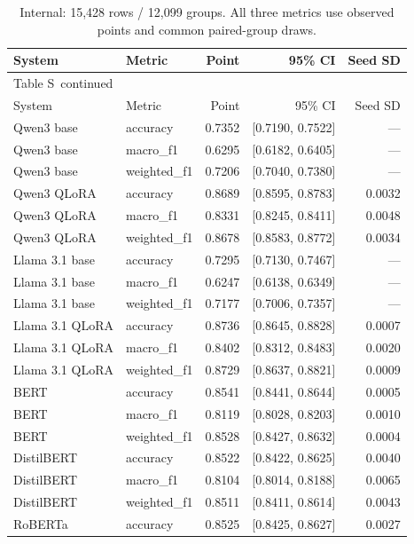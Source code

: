 \documentclass[10pt,a4paper]{article}
\renewcommand{\thetable}{S\arabic{table}}
\begin{document}
{\small
\setlength{\tabcolsep}{4pt}
\begin{longtable}{@{}llrrr@{}}
\caption{Internal: 15,428 rows / 12,099 groups. All three metrics use observed points and common paired-group draws.}\label{sup:metrics-internal}\\
\toprule
System & Metric & Point & 95\% CI & Seed SD \\
\midrule\endfirsthead
\multicolumn{5}{l}{\small Table \thetable\ continued}\\
\toprule
System & Metric & Point & 95\% CI & Seed SD \\
\midrule\endhead
\bottomrule\endfoot
Qwen3 base & accuracy & 0.7352 & [0.7190, 0.7522] & --- \\
Qwen3 base & macro\_f1 & 0.6295 & [0.6182, 0.6405] & --- \\
Qwen3 base & weighted\_f1 & 0.7206 & [0.7040, 0.7380] & --- \\
Qwen3 QLoRA & accuracy & 0.8689 & [0.8595, 0.8783] & 0.0032 \\
Qwen3 QLoRA & macro\_f1 & 0.8331 & [0.8245, 0.8411] & 0.0048 \\
Qwen3 QLoRA & weighted\_f1 & 0.8678 & [0.8583, 0.8772] & 0.0034 \\
Llama 3.1 base & accuracy & 0.7295 & [0.7130, 0.7467] & --- \\
Llama 3.1 base & macro\_f1 & 0.6247 & [0.6138, 0.6349] & --- \\
Llama 3.1 base & weighted\_f1 & 0.7177 & [0.7006, 0.7357] & --- \\
Llama 3.1 QLoRA & accuracy & 0.8736 & [0.8645, 0.8828] & 0.0007 \\
Llama 3.1 QLoRA & macro\_f1 & 0.8402 & [0.8312, 0.8483] & 0.0020 \\
Llama 3.1 QLoRA & weighted\_f1 & 0.8729 & [0.8637, 0.8821] & 0.0009 \\
BERT & accuracy & 0.8541 & [0.8441, 0.8644] & 0.0005 \\
BERT & macro\_f1 & 0.8119 & [0.8028, 0.8203] & 0.0010 \\
BERT & weighted\_f1 & 0.8528 & [0.8427, 0.8632] & 0.0004 \\
DistilBERT & accuracy & 0.8522 & [0.8422, 0.8625] & 0.0040 \\
DistilBERT & macro\_f1 & 0.8104 & [0.8014, 0.8188] & 0.0065 \\
DistilBERT & weighted\_f1 & 0.8511 & [0.8411, 0.8614] & 0.0043 \\
RoBERTa & accuracy & 0.8525 & [0.8425, 0.8627] & 0.0027 \\

\end{longtable}}
\end{document}
